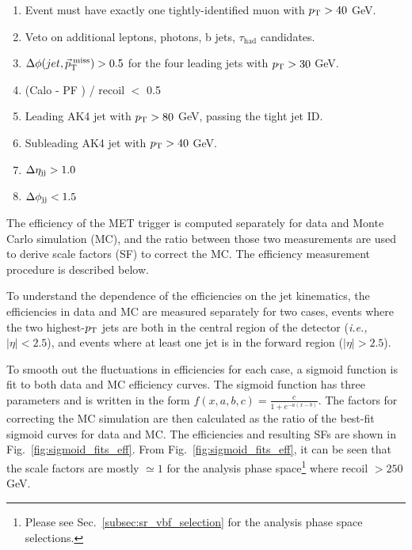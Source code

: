\begin{enumerate}
  \item Event must have exactly one tightly-identified muon with $p_{\textrm{T}} > 40$ GeV.
  \item Veto on additional leptons, photons, b jets, $\tau_{\textrm{had}}$ candidates.
  \item $\Delta\phi(jet,\vec{p}_{\textrm{T}}^{\;\textrm{miss}})>0.5$ for the four leading jets with $p_{\textrm{T}}>30$ GeV.
  \item (Calo \ptmiss - PF \ptmiss) / recoil $<$ 0.5
  \item Leading AK4 jet with $p_{\textrm{T}}>80$ GeV, passing the tight jet ID.
  \item Subleading AK4 jet with $p_{\textrm{T}}>40$ GeV.
  \item $\Delta \eta_{\textrm{jj}} > 1.0$
  \item $\Delta \phi_{\textrm{jj}} < 1.5$
\end{enumerate}

The efficiency of the MET trigger is computed separately for data and Monte Carlo simulation (MC),
and the ratio between those two measurements are used to derive scale factors (SF) to correct the MC.
The efficiency measurement procedure is described below.

To understand the dependence of the efficiencies on the jet kinematics, the efficiencies in data and MC are measured 
separately for two cases, events where the two highest-$p_{\textrm{T}}$ jets are both in the central region of the detector (\textit{i.e.,} $|\eta| < 2.5$), 
and events where at least one jet is in the forward region ($|\eta| > 2.5$).

To smooth out the fluctuations in efficiencies for each case, a sigmoid function is fit to both data and MC 
efficiency curves. The sigmoid function has three parameters and is written in the form $f(x,a,b,c) = \frac{c}{1+e^{-a(x-b)}}$. 
The factors for correcting the MC simulation are then calculated as the ratio of the best-fit sigmoid curves for data and MC.
The efficiencies and resulting SFs are shown in Fig.~\ref{fig:sigmoid_fits_eff}. From Fig.~\ref{fig:sigmoid_fits_eff}, 
it can be seen that the scale factors are mostly $\simeq 1$ for the analysis phase 
space\footnote{Please see Sec.~\ref{subsec:sr_vbf_selection} for the analysis phase space selections.} 
where recoil $> 250$ GeV.


